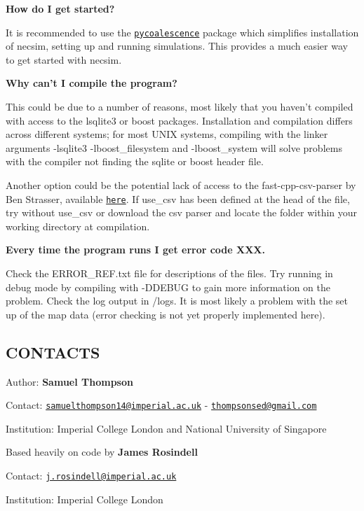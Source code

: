 \begin{DoxyItemize}
\item {\bfseries How do I get started?}
\begin{DoxyItemize}
\item It is recommended to use the \href{http://pycoalescence.readthedocs.io/}{\tt pycoalescence} package which simplifies installation of necsim, setting up and running simulations. This provides a much easier way to get started with necsim.
\end{DoxyItemize}
\item {\bfseries Why can’t I compile the program?}
\begin{DoxyItemize}
\item This could be due to a number of reasons, most likely that you haven’t compiled with access to the lsqlite3 or boost packages. Installation and compilation differs across different systems; for most U\+N\+IX systems, compiling with the linker arguments -\/lsqlite3 -\/lboost\+\_\+filesystem and -\/lboost\+\_\+system will solve problems with the compiler not finding the sqlite or boost header file.
\item Another option could be the potential lack of access to the fast-\/cpp-\/csv-\/parser by Ben Strasser, available \href{https://github.com/ben-strasser/fast-cpp-csv-parser}{\tt here}. If use\+\_\+csv has been defined at the head of the file, try without use\+\_\+csv or download the csv parser and locate the folder within your working directory at compilation.
\end{DoxyItemize}
\item {\bfseries Every time the program runs I get error code X\+XX.}
\begin{DoxyItemize}
\item Check the E\+R\+R\+O\+R\+\_\+\+R\+E\+F.\+txt file for descriptions of the files. Try running in debug mode by compiling with {\ttfamily -\/\+D\+D\+E\+B\+UG} to gain more information on the problem. Check the log output in /logs. It is most likely a problem with the set up of the map data (error checking is not yet properly implemented here).
\end{DoxyItemize}
\end{DoxyItemize}

\subsection*{C\+O\+N\+T\+A\+C\+TS}

Author\+: {\bfseries Samuel Thompson}

Contact\+: \href{mailto:samuelthompson14@imperial.ac.uk}{\tt samuelthompson14@imperial.\+ac.\+uk} -\/ \href{mailto:thompsonsed@gmail.com}{\tt thompsonsed@gmail.\+com}

Institution\+: Imperial College London and National University of Singapore

Based heavily on code by {\bfseries James Rosindell}

Contact\+: \href{mailto:j.rosindell@imperial.ac.uk}{\tt j.\+rosindell@imperial.\+ac.\+uk}

Institution\+: Imperial College London 